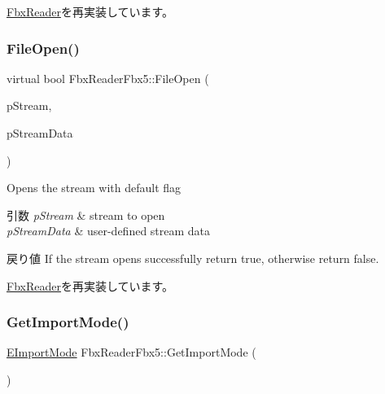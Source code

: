 \hyperlink{class_fbx_reader_a9e334ad0c2abd069c35a016413a8adcd}{Fbx\+Reader}を再実装しています。

\mbox{\label{class_fbx_reader_fbx5_a1ac1c0598fea61e91ac2c98de15a0d24}} 
\subsubsection{\texorpdfstring{File\+Open()}{FileOpen()}\hspace{0.1cm}{\footnotesize\ttfamily [5/5]}}
{\footnotesize\ttfamily virtual bool Fbx\+Reader\+Fbx5\+::\+File\+Open (\begin{DoxyParamCaption}\item[{\hyperlink{class_fbx_stream}{Fbx\+Stream} $\ast$}]{p\+Stream,  }\item[{void $\ast$}]{p\+Stream\+Data }\end{DoxyParamCaption})\hspace{0.3cm}{\ttfamily [virtual]}}

Opens the stream with default flag 
\begin{DoxyParams}{引数}
{\em p\+Stream} & stream to open \\
\hline
{\em p\+Stream\+Data} & user-\/defined stream data \\
\hline
\end{DoxyParams}
\begin{DoxyReturn}{戻り値}
If the stream opens successfully return {\ttfamily true}, otherwise return {\ttfamily false}. 
\end{DoxyReturn}


\hyperlink{class_fbx_reader_a819487a39b5e25f69a8dccf187ab4ab9}{Fbx\+Reader}を再実装しています。

\mbox{\label{class_fbx_reader_fbx5_a2124b8ecb7523ead3f623c47633e9e85}} 
\subsubsection{\texorpdfstring{Get\+Import\+Mode()}{GetImportMode()}}
{\footnotesize\ttfamily \hyperlink{class_fbx_reader_fbx5_a9d205ec64b33007dd74af093943b50c5}{E\+Import\+Mode} Fbx\+Reader\+Fbx5\+::\+Get\+Import\+Mode (\begin{DoxyParamCaption}{ }\end{DoxyParamCaption})}

